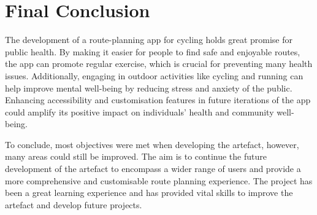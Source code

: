 \label{reflection-and-conclusion:final-conclusion}
\section{Final Conclusion}

The development of a route-planning app for cycling holds great promise for public health. By making it easier for people to find safe and enjoyable routes, the app can promote regular exercise, which is crucial for preventing many health issues. Additionally, engaging in outdoor activities like cycling and running can help improve mental well-being by reducing stress and anxiety of the public. Enhancing accessibility and customisation features in future iterations of the app could amplify its positive impact on individuals' health and community well-being. 

To conclude, most objectives were met when developing the artefact, however, many areas could still be improved. The aim is to continue the future development of the artefact to encompass a wider range of users and provide a more comprehensive and customisable route planning experience. The project has been a great learning experience and has provided vital skills to improve the artefact and develop future projects.

